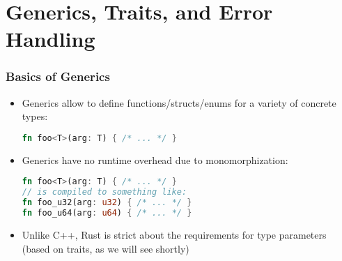  \section{Generics, Traits, and Error Handling}

\begin{frame}[fragile]
    \frametitle{Basics of Generics}

    \begin{itemize}
        \item Generics allow to define functions/structs/enums for a variety of concrete types:
        \begin{lstlisting}[language=rust]
fn foo<T>(arg: T) { /* ... */ }
        \end{lstlisting}
        \item Generics have no runtime overhead due to monomorphization:
        \begin{lstlisting}[language=rust]
fn foo<T>(arg: T) { /* ... */ }
// is compiled to something like:
fn foo_u32(arg: u32) { /* ... */ }
fn foo_u64(arg: u64) { /* ... */ }
        \end{lstlisting}
        \item Unlike C++, Rust is strict about the requirements for type parameters\\
        (based on traits, as we will see shortly)
    \end{itemize}
\end{frame}

